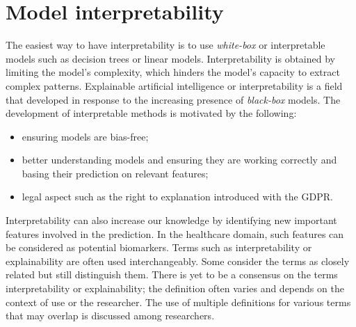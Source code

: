 \documentclass[../main.tex]{subfiles}
\begin{document}
\section{Model interpretability}
	The easiest way to have interpretability is to use \textit{white-box} or interpretable models such as decision trees or linear models.
	Interpretability is obtained by limiting the model's complexity, which hinders the model's capacity to extract complex patterns.
	Explainable artificial intelligence or interpretability is a field that developed in response to the increasing presence of \textit{black-box} models.
	The development of interpretable methods is motivated by the following:
	\begin{itemize}[nosep]
	  \item ensuring models are bias-free;
	  \item better understanding models and ensuring they are working correctly and basing their prediction on relevant features;
	  \item legal aspect such as the right to explanation introduced with the GDPR.
	\end{itemize}
	Interpretability can also increase our knowledge by identifying new important features involved in the prediction.
	In the healthcare domain, such features can be considered as potential biomarkers.
	Terms such as interpretability or explainability are often used interchangeably.
	Some consider the terms as closely related but still distinguish them.
	There is yet to be a consensus on the terms interpretability or explainability; the definition often varies and depends on the context of use or the researcher.
	The use of multiple definitions for various terms that may overlap is discussed among researchers.
\end{document}
